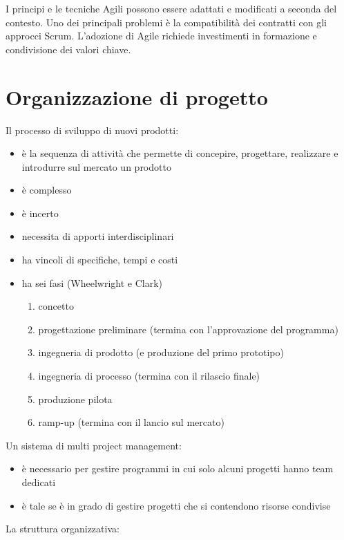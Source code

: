 \documentclass[answers, a4paper, 11pt]{exam}
\begin{document}
I principi e le tecniche Agili possono essere adattati e modificati a seconda del contesto.
Uno dei principali problemi è la compatibilità dei contratti con gli approcci Scrum.
L'adozione di Agile richiede investimenti in formazione e condivisione dei valori chiave.

\section{Organizzazione di progetto}

Il processo di sviluppo di nuovi prodotti:
\begin{itemize}
    \item è la sequenza di attività che permette di concepire, progettare, realizzare e introdurre sul mercato un prodotto
    \item è complesso
    \item è incerto
    \item necessita di apporti interdisciplinari
    \item ha vincoli di specifiche, tempi e costi
    \item ha sei fasi (Wheelwright e Clark)
    \begin{enumerate}
        \item concetto
        \item progettazione preliminare (termina con l'approvazione del programma)
        \item ingegneria di prodotto (e produzione del primo prototipo)
        \item ingegneria di processo (termina con il rilascio finale)
        \item produzione pilota
        \item ramp-up (termina con il lancio sul mercato)
    \end{enumerate}
\end{itemize}

Un sistema di multi project management:

\begin{itemize}
    \item è necessario per gestire programmi in cui solo alcuni progetti hanno team dedicati
    \item è tale se è in grado di gestire progetti che si contendono risorse condivise 
\end{itemize}

La struttura organizzativa:
\end{document}
